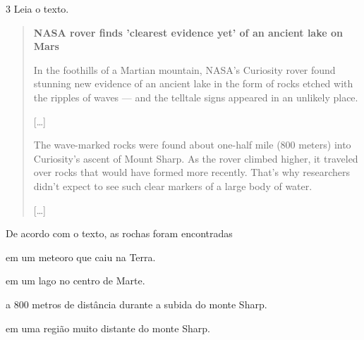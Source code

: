 
\num{3} Leia o texto.

\begin{quote}
\textbf{NASA rover finds 'clearest evidence yet' of an ancient lake on Mars}

In the foothills of a Martian mountain, NASA's Curiosity rover found
stunning new evidence of an ancient lake in the form of rocks etched
with the ripples of waves --- and the telltale signs appeared in an
unlikely place.

{[}\ldots{}{]}

The wave-marked rocks were found about one-half mile (800 meters) into
Curiosity's ascent of Mount Sharp. As the rover climbed higher, it
traveled over rocks that would have formed more recently. That's why
researchers didn't expect to see such clear markers of a large body of
water.

{[}\ldots{}{]}

\end{quote}


De acordo com o texto, as rochas foram encontradas

\begin{escolha}
\item em um meteoro que caiu na Terra.

\item em um lago no centro de Marte.

\item a 800 metros de distância durante a subida do monte Sharp.

\item em uma região muito distante do monte Sharp.
\end{escolha}

